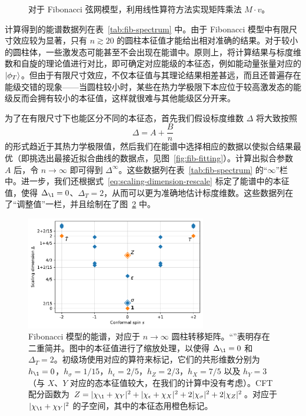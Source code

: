\begin{figure}[ht]
  \caption[利用线性算符方法实现矩阵乘法]{对于 Fibonacci 弦网模型，利用线性算符方法实现矩阵乘法 $M\cdot v$。}
  \label{fig:fib-linear-operator}
\end{figure}

计算得到的能谱数据列在表~\ref{tab:fib-spectrum} 中。由于 Fibonacci 模型中有限尺寸效应较为显著，只有 $n\gtrsim20$ 的圆柱本征值才能给出相对准确的结果。对于较小的圆柱体，一些激发态可能甚至不会出现在能谱中。原则上，将计算结果与标度维数和自旋的理论值进行对比，即可确定对应能级的本征态，例如能动量张量对应的 $\ket*{\phi_T}$。但由于有限尺寸效应，不仅本征值与其理论结果相差甚远，而且还普遍存在能级交错的现象——当圆柱较小时，某些在热力学极限下本应位于较高激发态的能级反而会拥有较小的本征值，这样就很难与其他能级区分开来。

为了在有限尺寸下也能区分不同的本征态，首先我们假设标度维数 $\Delta$ 将大致按照
\begin{equation}
  \Delta = A + \frac{B}{n}
\end{equation}
的形式趋近于其热力学极限值\cite{schuler2016universal}，然后我们在能谱中选择相应的数据以使拟合结果最优（即挑选出最接近拟合曲线的数据点，见图~\ref{fig:fib-fitting}）。计算出拟合参数 $A$ 后，令 $n\to\infty$ 即可得到 $\Delta^\infty$。这些数据列在表~\ref{tab:fib-spectrum} 的“$\infty$”栏中。进一步，我们还根据式~\eqref{eq:scaling-dimension-rescale} 标定了能谱中的本征值，使得 $\Delta_{\1}=0$、$\Delta_T=2$，从而可以更为准确地估计标度维数。这些数据列在了“调整值”一栏，并且绘制在了图~\ref{fig:fib-spectrum} 中。

\begin{figure}[ht]
  \centering
  \includegraphics[width=0.7\textwidth]{images/fibonacci/fib-spectrum.pdf}
  \caption[Fibonacci 模型的能谱]{Fibonacci 模型的能谱，对应于 $n\to\infty$ 圆柱转移矩阵。“\unskip”表明存在二重简并。图中的本征值进行了缩放处理，以使得 $\Delta_{\1}=0$ 和 $\Delta_T=2$。初级场使用对应的算符来标记，它们的共形维数分别为 $h_{\1}=0$，$h_\sigma=1/15$，$h_\epsilon=2/5$，$h_Z=2/3$，$h_X=7/5$ 以及 $h_Y=3$（与 $X$、$Y$ 对应的态本征值较大，在我们的计算中没有考虑）。CFT 配分函数为 $Z=|\chi_{\1}+\chi_Y|^2+|\chi_\epsilon+\chi_X|^2+2|\chi_\sigma|^2\discretionary{}{}{}+2|\chi_Z|^2$\cite{vanhove2018mapping}。对应于 $|\chi_{\1}+\chi_Y|^2$ 的子空间，其中的本征态用橙色标记。}
  \label{fig:fib-spectrum}
\end{figure}


